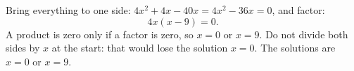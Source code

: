 Bring everything to one side: $4x^2+4x-40x=4x^2-36x=0$, and factor:
\[
4x(x-9)=0 .
\]
A product is zero only if a factor is zero, so $x=0$ or $x=9$. Do not divide both sides by $x$ at the start: that would lose the solution $x=0$. The solutions are $\boxed{x=0\text{ or }x=9}$.
